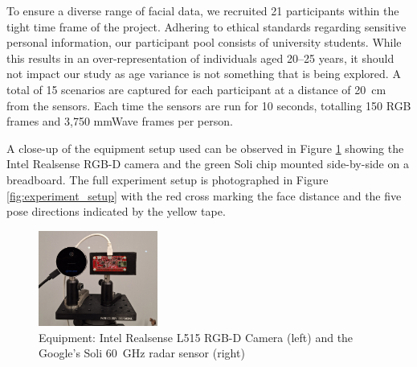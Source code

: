 \documentclass{mpaper}
\begin{document}

To ensure a diverse range of facial data, we recruited 21 participants within the tight time frame of the project. Adhering to ethical standards regarding sensitive personal information, our participant pool consists of university students. While this results in an over-representation of individuals aged 20--25 years, it should not impact our study as age variance is not something that is being explored. A total of 15 scenarios are captured for each participant at a distance of \qty{20}{\cm} from the sensors. Each time the sensors are run for 10 seconds, totalling 150 RGB frames and 3,750 mmWave frames per person.

A close-up of the equipment setup used can be observed in Figure \ref{fig:equipment} showing the Intel Realsense RGB-D camera and the green Soli chip mounted side-by-side on a breadboard. The full experiment setup is photographed in Figure \ref{fig:experiment_setup} with the red cross marking the face distance and the five pose directions indicated by the yellow tape.

\begin{figure}[h!]
    \centering
    \includegraphics[width=0.35\textwidth,decodearray={1 1 1 1 1 1}]{figures/equipment.pdf}
    \vspace{0.2cm}
    \caption{Equipment: Intel Realsense L515 RGB-D Camera (left) and the Google's Soli \qty{60}{\GHz} radar sensor (right)}
    \label{fig:equipment}
\end{figure}
\end{document}
